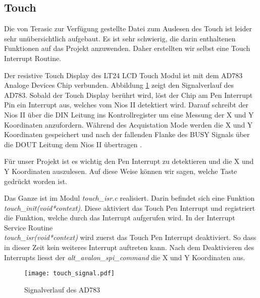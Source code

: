 \subsection{Touch}\label{subsec:touch}
 Die von Terasic zur Verfügung gestellte Datei zum Auslesen des Touch ist leider sehr unübersichtlich aufgebaut. Es ist sehr schwierig, die darin enthaltenen Funktionen auf das Projekt anzuwenden. Daher erstellten wir selbst eine Touch Interrupt Routine. 
 
 Der resistive Touch Display des LT24 LCD Touch Modul ist mit dem AD783 Analoge Devices Chip verbunden. Abbildung \ref{img:AD783_Signalverlauf} zeigt den Signalverlauf des AD783.  Sobald der Touch Display berührt wird, löst der Chip am Pen Interrupt Pin ein Interrupt aus, welches vom Nios II detektiert wird. Darauf schreibt der Nios II über die DIN Leitung ins Kontrollregister um eine Messung der X und Y Koordinaten anzufordern. Während des Acquistation Mode werden die X und Y Koordinaten gespeichert und nach der fallenden Flanke des BUSY Signals über die DOUT Leitung dem Nios II übertragen \cite{AD7843}. 
 
 Für unser Projekt ist es wichtig den Pen Interrupt zu detektieren und die X und Y Koordinaten auszulesen. Auf diese Weise können wir sagen, welche Taste gedrückt worden ist.
 
Das Ganze ist im Modul \textit{touch\_isr.c} realisiert. Darin befindet sich eine Funktion \\ \textit{touch\_init(void*context)}. Diese aktiviert das Touch Pen Interrupt  und registriert die Funktion, welche durch das Interrupt aufgerufen wird. 
In der Interrupt Service Routine\\ \textit{touch\_isr(void*context)} wird zuerst das Touch Pen Interrupt  deaktiviert. So dass in dieser Zeit kein weiteres Interrupt auftreten kann. Nach dem Deaktivieren des Interrupts liesst der \textit{alt\_avalon\_spi\_command} die X und Y Koordinaten aus.

\begin{figure}[h!]
	\centering
	\texttt{[image: touch\_signal.pdf]}
	\caption{Signalverlauf des AD783} 
	\label{img:AD783_Signalverlauf}
\end{figure}  
